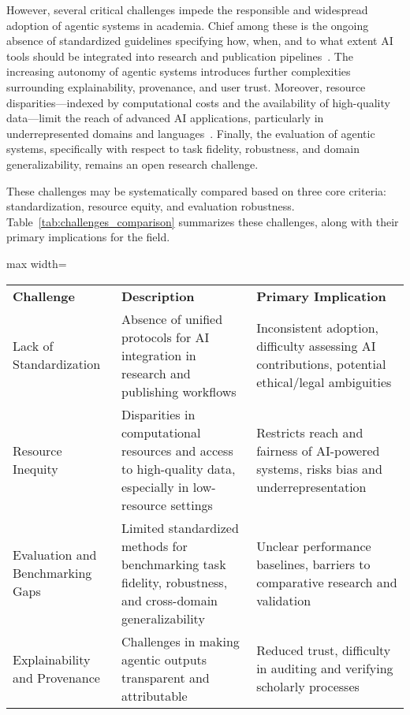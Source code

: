 \documentclass[sigconf]{acmart}
\begin{document}
However, several critical challenges impede the responsible and widespread adoption of agentic systems in academia. Chief among these is the ongoing absence of standardized guidelines specifying how, when, and to what extent AI tools should be integrated into research and publication pipelines~\cite{ref101,ref106}. The increasing autonomy of agentic systems introduces further complexities surrounding explainability, provenance, and user trust. Moreover, resource disparities—indexed by computational costs and the availability of high-quality data—limit the reach of advanced AI applications, particularly in underrepresented domains and languages~\cite{ref103,ref104,ref106}. Finally, the evaluation of agentic systems, specifically with respect to task fidelity, robustness, and domain generalizability, remains an open research challenge.

These challenges may be systematically compared based on three core criteria: standardization, resource equity, and evaluation robustness. Table~\ref{tab:challenges_comparison} summarizes these challenges, along with their primary implications for the field.

\begin{table*}[htbp]
\centering
\caption{Principal challenges in integrating agentic systems into academic workflows, mapped to their primary implications.}
\label{tab:challenges_comparison}
\begin{adjustbox}{max width=\textwidth}
\begin{tabular}{@{}lll@{}}
\toprule
\textbf{Challenge} & \textbf{Description} & \textbf{Primary Implication} \\
Lack of Standardization & Absence of unified protocols for AI integration in research and publishing workflows & Inconsistent adoption, difficulty assessing AI contributions, potential ethical/legal ambiguities \\
Resource Inequity & Disparities in computational resources and access to high-quality data, especially in low-resource settings & Restricts reach and fairness of AI-powered systems, risks bias and underrepresentation \\
Evaluation and Benchmarking Gaps & Limited standardized methods for benchmarking task fidelity, robustness, and cross-domain generalizability & Unclear performance baselines, barriers to comparative research and validation \\
Explainability and Provenance & Challenges in making agentic outputs transparent and attributable & Reduced trust, difficulty in auditing and verifying scholarly processes \\
\bottomrule
\end{tabular}
\end{adjustbox}
\end{table*}
\end{document}
